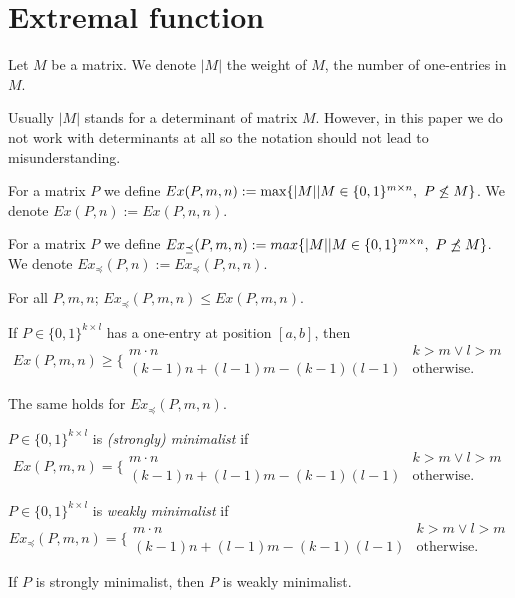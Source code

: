 \chapter{Extremal function}
\begin{ntn}
Let $M$ be a matrix. We denote $|M|$ the weight of $M$, the number of one-entries in $M$.
\end{ntn}
Usually $|M|$ stands for a determinant of matrix $M$. However, in this paper we do not work with determinants at all so the notation should not lead to misunderstanding.
\begin{defn}
For a matrix $P$ we define $Ex(P,m,n):=\max\{|M||M\in\Mat,\ \PnsmM\}$. We denote $Ex(P,n):=Ex(P,n,n)$.
\end{defn}
\begin{defn}
For a matrix $P$ we define $Ex_{\preceq}(P,m,n):=max\{|M||M\in\Mat,\ \PnimM\}$. We denote $Ex_{\preceq}(P,n):=Ex_{\preceq}(P,n,n)$.
\end{defn}
\begin{obs}
For all $P,m,n$; $Ex_{\preceq}(P,m,n)\leq Ex(P,m,n)$.
\end{obs}
\begin{obs}
If $P\in\{0,1\}^{k\times l}$ has a one-entry at position $[a,b]$, then $$Ex(P,m,n)\geq\Big\{\begin{array}{ll}
m\cdot n & k>m\vee l>m \\
(k-1)n+(l-1)m-(k-1)(l-1) & \text{otherwise.}
\end{array}$$
\end{obs}
\begin{obs}
The same holds for $Ex_{\preceq}(P,m,n).$
\end{obs}
\begin{defn}
$P\in\{0,1\}^{k\times l}$ is \emph{(strongly) minimalist} if
$$Ex(P,m,n)=\Big\{\begin{array}{ll}
m\cdot n & k>m\vee l>m \\
(k-1)n+(l-1)m-(k-1)(l-1) & \text{otherwise.}
\end{array}$$
\end{defn}
\begin{defn}
$P\in\{0,1\}^{k\times l}$ is \emph{weakly minimalist} if
$$Ex_{\preceq}(P,m,n)=\Big\{\begin{array}{ll}
m\cdot n & k>m\vee l>m \\
(k-1)n+(l-1)m-(k-1)(l-1) & \text{otherwise.}
\end{array}$$
\end{defn}
\begin{obs}
If $P$ is strongly minimalist, then $P$ is weakly minimalist.
\end{obs}
